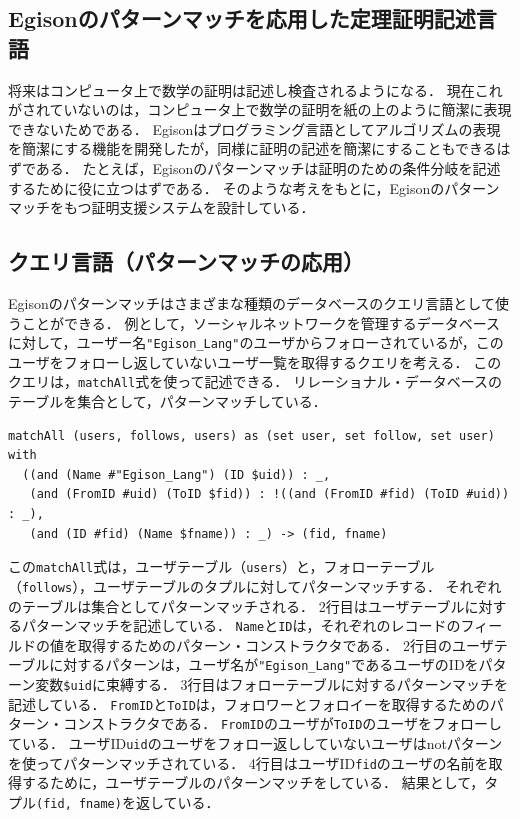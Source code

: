 \subsection{Egisonのパターンマッチを応用した定理証明記述言語}

将来はコンピュータ上で数学の証明は記述し検査されるようになる．
現在これがされていないのは，コンピュータ上で数学の証明を紙の上のように簡潔に表現できないためである．
Egisonはプログラミング言語としてアルゴリズムの表現を簡潔にする機能を開発したが，同様に証明の記述を簡潔にすることもできるはずである．
たとえば，Egisonのパターンマッチは証明のための条件分岐を記述するために役に立つはずである．
そのような考えをもとに，Egisonのパターンマッチをもつ証明支援システムを設計している\cite{egi2020pattern}．

\subsection{クエリ言語（パターンマッチの応用）}

Egisonのパターンマッチはさまざまな種類のデータベースのクエリ言語として使うことができる．
例として，ソーシャルネットワークを管理するデータベースに対して，ユーザー名\lstinline|"Egison_Lang"|のユーザからフォローされているが，このユーザをフォローし返していないユーザ一覧を取得するクエリを考える．
このクエリは，\lstinline{matchAll}式を使って記述できる．
リレーショナル・データベースのテーブルを集合として，パターンマッチしている．
\begin{lstlisting}[language=egison]
matchAll (users, follows, users) as (set user, set follow, set user) with
  ((and (Name #"Egison_Lang") (ID $uid)) : _,
   (and (FromID #uid) (ToID $fid)) : !((and (FromID #fid) (ToID #uid)) : _),
   (and (ID #fid) (Name $fname)) : _) -> (fid, fname)
\end{lstlisting}
この\lstinline{matchAll}式は，ユーザテーブル（\lstinline{users}）と，フォローテーブル（\lstinline{follows}），ユーザテーブルのタプルに対してパターンマッチする．
それぞれのテーブルは集合としてパターンマッチされる．
2行目はユーザテーブルに対するパターンマッチを記述している．
\lstinline{Name}と\lstinline{ID}は，それぞれのレコードのフィールドの値を取得するためのパターン・コンストラクタである．
2行目のユーザテーブルに対するパターンは，ユーザ名が\lstinline{"Egison_Lang"}であるユーザのIDをパターン変数\lstinline{$uid}に束縛する．
3行目はフォローテーブルに対するパターンマッチを記述している．
\lstinline{FromID}と\lstinline{ToID}は，フォロワーとフォロイーを取得するためのパターン・コンストラクタである．
\lstinline{FromID}のユーザが\lstinline{ToID}のユーザをフォローしている．
ユーザID\lstinline{uid}のユーザをフォロー返ししていないユーザはnotパターンを使ってパターンマッチされている．
4行目はユーザID\lstinline{fid}のユーザの名前を取得するために，ユーザテーブルのパターンマッチをしている．
結果として，タプル\lstinline{(fid, fname)}を返している．

